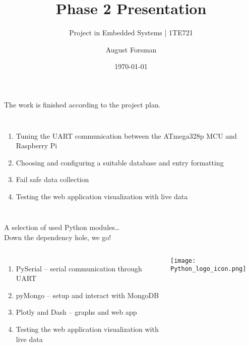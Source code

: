 \documentclass[aspectratio=169, 9pt]{uu-beamer}
\title{Phase 2 Presentation}
\subtitle{Project in Embedded Systems | 1TE721}
\author[A. Forsman]{August Forsman}
\date{\today}
\institute[UU]{Uppsala Universitet}
\begin{document}

\titlepage



\begin{frame}
    The work is finished according to the project plan.
    \vspace{5mm}
    \begin{columns}
        \begin{enumerate}
          \item Tuning the UART communication between the ATmega328p MCU and Raspberry Pi
          \item Choosing and configuring a suitable database and entry formatting
          \item Fail safe data collection  
          \item Testing the web application visualization with live data
        \end{enumerate}

      \end{columns}
    
\end{frame}

\begin{frame}
    A selection of used Python modules\ldots \\
    Down the dependency hole, we go!
    \begin{columns}
        \begin{enumerate}
          \item PySerial -- serial communication through UART 
          \item pyMongo -- setup and interact with MongoDB
          \item Plotly and Dash -- graphs and web app  
          \item Testing the web application visualization with live data
        \end{enumerate}

        \texttt{[image: Python\_logo\_icon.png]}
      \end{columns}
    
\end{frame}
\end{document}
